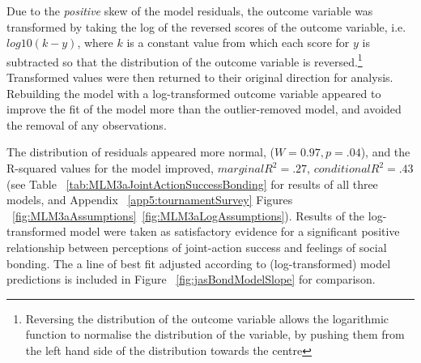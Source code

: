 Due to the \textit{positive} skew of the model residuals, the outcome variable was transformed by taking the log of the reversed scores of the outcome variable, i.e. $log10(k - y)$, where $k$ is a constant value from which each score for $y$ is subtracted so that the distribution of the outcome variable is reversed\citep{Howell2012}.\footnote{Reversing the distribution of the outcome variable allows the logarithmic function to normalise the distribution of the variable, by pushing them from the left hand side of the distribution towards the centre}  Transformed values were then returned to their original direction for analysis\citep{Field2012}.  Rebuilding the model with a log-transformed outcome variable appeared to improve the fit of the model more than the outlier-removed model, and avoided the removal of any observations.

The distribution of residuals appeared more normal, ($W = 0.97, p = .04$), and the R-squared values for the model improved, $marginal R^2 = .27$, $conditional R^2 = .43$ (see Table ~\ref{tab:MLM3aJointActionSuccessBonding} for results of all three models, and Appendix ~\ref{app5:tournamentSurvey} Figures ~\ref{fig:MLM3aAssumptions}\nobreakdash~\ref{fig:MLM3aLogAssumptions}). Results of the log-transformed model were taken as satisfactory evidence for a significant positive relationship between perceptions of joint-action success and feelings of social bonding.  The a line of best fit adjusted according to (log-transformed) model predictions is included in Figure ~\ref{fig:jasBondModelSlope} for comparison.
  


